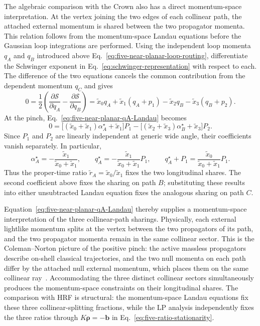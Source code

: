 \documentclass[a4paper,11pt]{article}
\begin{document}
The algebraic comparison with the Crown also has a direct momentum-space
interpretation.  At the vertex joining the two edges of each collinear path,
the attached external momentum is shared between the two propagator momenta.
This relation follows from the momentum-space Landau
equations before the Gaussian loop integrations are performed.  Using the
independent loop momenta \(q_A\) and \(q_B\) introduced above
Eq.~\eqref{eq:five-near-planar-loop-routing}, differentiate the Schwinger
exponent in Eq.~\eqref{eq:schwinger-representation} with respect to each.
The difference of the two equations cancels the common contribution from
the dependent momentum \(q_C\) and gives
\begin{equation}
 0=\frac12\left(
 \frac{\partial\mathcal S}{\partial q_A}
 -\frac{\partial\mathcal S}{\partial q_B}\right)
 =\widetilde x_0q_A+\widetilde x_1(q_A+p_1)
  -\widetilde x_2q_B-\widetilde x_3(q_B+p_2).
 \label{eq:five-near-planar-qA-Landau}
\end{equation}
At the pinch, Eq.~\eqref{eq:five-near-planar-qA-Landau} becomes
\[
 0=\bigl[(\widetilde x_0+\widetilde x_1)\alpha_A^\star
          +\widetilde x_1\bigr]P_1
   -\bigl[(\widetilde x_2+\widetilde x_3)\alpha_B^\star
          +\widetilde x_3\bigr]P_2.
\]
Since \(P_1\) and \(P_2\) are linearly independent at generic wide angle,
their coefficients vanish separately.  In particular,
\[
 \alpha_A^\star=-\frac{\widetilde x_1}
                         {\widetilde x_0+\widetilde x_1},
 \qquad
 q_A^\star=-\frac{\widetilde x_1}
                    {\widetilde x_0+\widetilde x_1}P_1,
 \qquad
 q_A^\star+P_1=\frac{\widetilde x_0}
                       {\widetilde x_0+\widetilde x_1}P_1.
\]
Thus the proper-time ratio
\(\widetilde r_A=\widetilde x_0/\widetilde x_1\) fixes the two
longitudinal shares.
The second coefficient above fixes the sharing on path \(B\); substituting
these results into either unsubtracted Landau equation fixes the analogous
sharing on path \(C\).

Equation~\eqref{eq:five-near-planar-qA-Landau} thereby supplies a
momentum-space interpretation of the three collinear-path sharings.
Physically, each external lightlike momentum splits at the vertex between
the two propagators of its path, and the two propagator momenta remain in the
same collinear sector.  This is the Coleman--Norton picture of the positive
pinch: the active massless propagators describe on-shell classical
trajectories, and the two null momenta on each path differ by the attached
null external momentum, which places them on the same collinear
ray~\cite{Coleman:1965cn,Collins:2020euz}.  Accommodating the three distinct
collinear sectors
simultaneously produces the momentum-space constraints on their longitudinal
shares.  The comparison with HRF is structural: the momentum-space Landau
equations fix these three collinear-splitting fractions, while the LP analysis
independently fixes the three ratios through
\(K\boldsymbol\rho=-\boldsymbol b\) in
Eq.~\eqref{eq:five-ratio-stationarity}.
\end{document}
